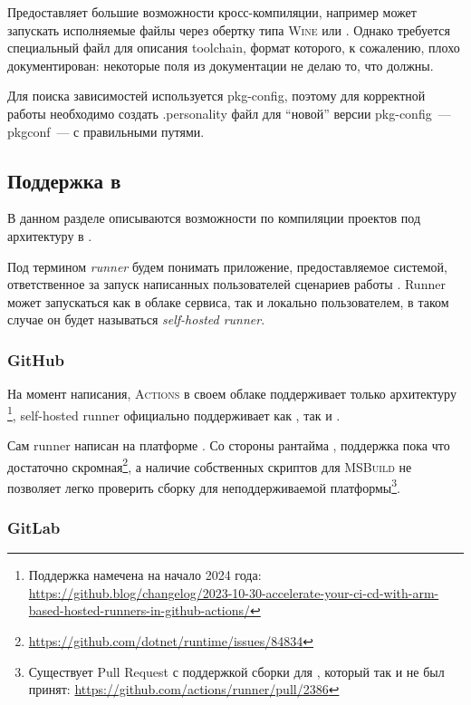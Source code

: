 Предоставляет большие возможности кросс-компиляции, например может запускать исполняемые файлы через обертку типа \textsc{Wine} или \qemu{}.
Однако требуется специальный файл для описания toolchain, формат которого, к сожалению, плохо документирован: некоторые поля из документации не делаю то, что должны.

Для поиска зависимостей используется pkg-config, поэтому для корректной работы необходимо создать .personality файл для \enquote{новой} версии pkg-config~--- pkgconf~--- с правильными путями.

\subsection{Поддержка в \ci{}}

В данном разделе описываются возможности по компиляции проектов под архитектуру \riscv{} в \ci{}.

\begin{definition}[Runner]
	Под термином \textit{runner} будем понимать приложение, предоставляемое \ci{} системой, ответственное за запуск написанных пользователей сценариев работы \ci{}.
	Runner может запускаться как в облаке \ci{} сервиса, так и локально пользователем, в таком случае он будет называться \textit{self-hosted runner}.
\end{definition}

\subsubsection{GitHub}

На момент написания, \GitHub{} \textsc{Actions} в своем облаке поддерживает только архитектуру \amd{}\footnote{Поддержка \arm{} намечена на начало 2024 года: \url{https://github.blog/changelog/2023-10-30-accelerate-your-ci-cd-with-arm-based-hosted-runners-in-github-actions/}}, self-hosted runner официально поддерживает как \amd{}, так и \arm{}.

Сам runner написан на платформе \dotnet{}.
Со стороны рантайма \dotnet{}, поддержка \riscv{} пока что достаточно скромная\footnote{\url{https://github.com/dotnet/runtime/issues/84834}}, а наличие собственных скриптов для \textsc{MSBuild} не позволяет легко проверить сборку для неподдерживаемой платформы\footnote{Существует Pull Request с поддержкой сборки для \power{}, который так и не был принят: \url{https://github.com/actions/runner/pull/2386}}.

\subsubsection{GitLab}

